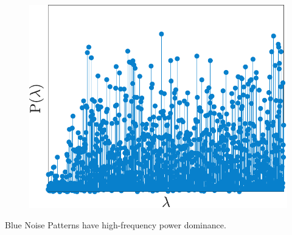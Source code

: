\documentclass[11pts]{beamer}
\begin{document}
\begin{frame}
\begin{minipage}{0.45\textwidth}
\begin{figure}
     \includegraphics[scale=0.37]{IM/Samplig_SPC_BN.pdf}
 \end{figure}
    \end{minipage}
\centering
 Blue Noise Patterns have high-frequency power dominance.
 
\end{frame}
\end{document}
